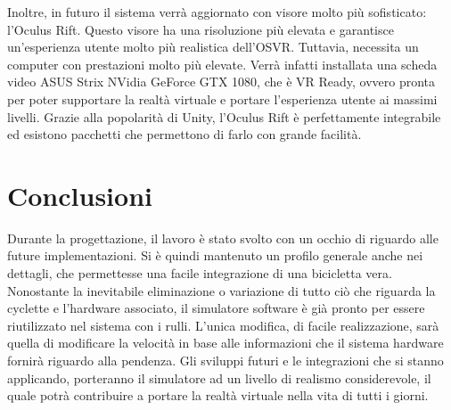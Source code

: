 \noindent Inoltre, in futuro il sistema verrà aggiornato con visore molto più sofisticato: l'Oculus Rift. Questo visore ha una risoluzione più elevata e garantisce un'esperienza utente molto più realistica dell'OSVR. Tuttavia, necessita un computer con prestazioni molto più elevate. Verrà infatti installata una scheda video ASUS Strix NVidia GeForce GTX 1080, che è VR Ready, ovvero pronta per poter supportare la realtà virtuale e portare l'esperienza utente ai massimi livelli. Grazie alla popolarità di Unity, l'Oculus Rift è perfettamente integrabile ed esistono pacchetti che permettono di farlo con grande facilità.
\newpage
\section{Conclusioni}
Durante la progettazione, il lavoro è stato svolto con un occhio di riguardo alle future implementazioni. Si è quindi mantenuto un profilo generale anche nei dettagli, che permettesse una facile integrazione di una bicicletta vera. Nonostante la inevitabile eliminazione o variazione di tutto ciò che riguarda la cyclette e l'hardware associato, il simulatore software è già pronto per essere riutilizzato nel sistema con i rulli. L'unica modifica, di facile realizzazione, sarà quella di modificare la velocità in base alle informazioni che il sistema hardware fornirà riguardo alla pendenza. 
Gli sviluppi futuri e le integrazioni che si stanno applicando, porteranno il simulatore ad un livello di realismo considerevole, il quale potrà contribuire a portare la realtà virtuale nella vita di tutti i giorni.
